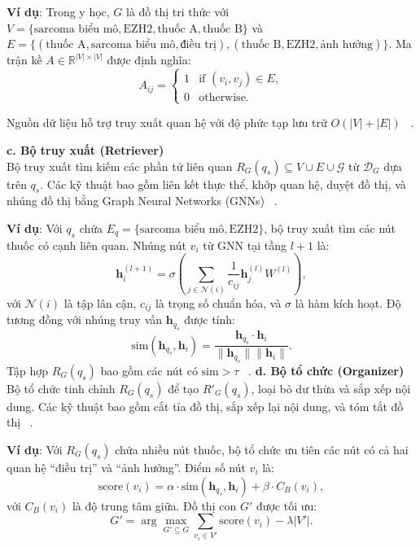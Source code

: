\documentclass[a4paper]{article}
\begin{document}
\textbf{Ví dụ}: Trong y học, $G$ là đồ thị tri thức với $V = \{\text{sarcoma biểu mô}, \text{EZH2}, \text{thuốc A}, \text{thuốc B}\}$ và $E = \{(\text{thuốc A}, \text{sarcoma biểu mô}, \text{điều trị}), (\text{thuốc B}, \text{EZH2}, \text{ảnh hưởng})\}$. Ma trận kề $A \in \mathbb{R}^{|V| \times |V|}$ được định nghĩa:
\begin{equation}
    A_{ij} = \begin{cases} 
        1 & \text{if } (v_i, v_j) \in E, \\
        0 & \text{otherwise.}
    \end{cases}
\end{equation}

Nguồn dữ liệu hỗ trợ truy xuất quan hệ với độ phức tạp lưu trữ $O(|V| + |E|)$ ~\cite{Zhang2022GraphIndex}.

\textbf{c.  Bộ truy xuất (Retriever)}\\
Bộ truy xuất tìm kiếm các phần tử liên quan $R_G(q_s) \subseteq V \cup E \cup \mathcal{G}$ từ $\mathcal{D}_G$ dựa trên $q_s$. Các kỹ thuật bao gồm liên kết thực thể, khớp quan hệ, duyệt đồ thị, và nhúng đồ thị bằng Graph Neural Networks (GNNs) ~\cite{Wu2020GNN}.

\textbf{Ví dụ}: Với $q_s$ chứa $E_q = \{\text{sarcoma biểu mô}, \text{EZH2}\}$, bộ truy xuất tìm các nút thuốc có cạnh liên quan. Nhúng nút $v_i$ từ GNN tại tầng $l+1$ là:
\begin{equation}
    \mathbf{h}_i^{(l+1)} = \sigma \left( \sum_{j \in \mathcal{N}(i)} \frac{1}{c_{ij}} \mathbf{h}_j^{(l)} W^{(l)} \right),
\end{equation}
với $\mathcal{N}(i)$ là tập lân cận, $c_{ij}$ là trọng số chuẩn hóa, và $\sigma$ là hàm kích hoạt. Độ tương đồng với nhúng truy vấn $\mathbf{h}_{q_s}$ được tính:
\begin{equation}
    \text{sim}(\mathbf{h}_{q_s}, \mathbf{h}_i) = \frac{\mathbf{h}_{q_s} \cdot \mathbf{h}_i}{\|\mathbf{h}_{q_s}\| \|\mathbf{h}_i\|}.
\end{equation}
Tập hợp $R_G(q_s)$ bao gồm các nút có $\text{sim} > \tau$ ~\cite{Wu2020GNN}.
\textbf{d.  Bộ tổ chức (Organizer)}\\
Bộ tổ chức tinh chỉnh $R_G(q_s)$ để tạo $R'_G(q_s)$, loại bỏ dư thừa và sắp xếp nội dung. Các kỹ thuật bao gồm cắt tỉa đồ thị, sắp xếp lại nội dung, và tóm tắt đồ thị ~\cite{Li2023GraphOrg}.

\textbf{Ví dụ}: Với $R_G(q_s)$ chứa nhiều nút thuốc, bộ tổ chức ưu tiên các nút có cả hai quan hệ ``điều trị'' và ``ảnh hưởng''. Điểm số nút $v_i$ là:
\begin{equation}
    \text{score}(v_i) = \alpha \cdot \text{sim}(\mathbf{h}_{q_s}, \mathbf{h}_i) + \beta \cdot C_B(v_i),
\end{equation}
với $C_B(v_i)$ là độ trung tâm giữa. Đồ thị con $G'$ được tối ưu:
\begin{equation}
    G' = \arg\max_{G' \subseteq G} \sum_{v_i \in V'} \text{score}(v_i) - \lambda |V'|.
\end{equation}
\end{document}
